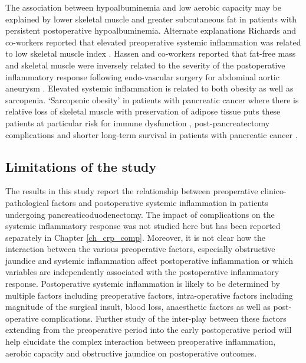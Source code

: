 The association between hypoalbuminemia and low aerobic capacity may be explained by lower skeletal muscle and greater subcutaneous fat in patients with persistent postoperative hypoalbuminemia.
Alternate explanations 
Richards and co-workers reported that elevated preoperative systemic inflammation was related to low skeletal muscle index \parencite{hassen_preoperative_2007}.
Hassen and co-workers reported that fat-free mass and skeletal muscle were inversely related to the severity of the postoperative inflammatory response following endo-vascular surgery for abdominal aortic aneurysm \parencite{hassen_preoperative_2007}.
Elevated systemic inflammation is related to both obesity as well as sarcopenia. 
`Sarcopenic obesity' in patients with pancreatic cancer where there is relative loss of skeletal muscle with preservation of adipose tissue puts these patients at particular risk for immune dysfunction \parencite{berg_adipose_2005, reisinger_sarcopenia_2015}, post-pancreatectomy complications \parencite{joglekar_sarcopenia_2015} and shorter long-term survival in patients with pancreatic cancer \parencite{tan_sarcopenia_2009, peng_impact_2012}.

\subsection{Limitations of the study}

The results in this study report the relationship between preoperative clinico-pathological factors and postoperative systemic inflammation in patients undergoing pancreaticoduodenectomy. 
The impact of complications on the systemic inflammatory response was not studied here but has been reported separately in Chapter \ref{ch_crp_comp}. 
Moreover, it is not clear how the interaction between the various preoperative factors, especially obstructive jaundice and systemic inflammation affect postoperative inflammation or which variables are independently associated with the postoperative inflammatory response.
Postoperative systemic inflammation is likely to be determined by multiple factors including preoperative factors, intra-operative factors including magnitude of the surgical insult, blood loss, anaesthetic factors as well as post-operative complications.
Further study of the inter-play between these factors extending from the preoperative period into the early postoperative period will help elucidate the complex interaction between preoperative inflammation, aerobic capacity and obstructive jaundice on postoperative outcomes. 

